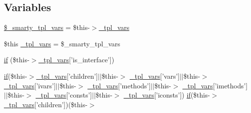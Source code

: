 \subsection*{\-Variables}
\begin{DoxyCompactItemize}
\item 
\hyperlink{34d6fa4bfd5eef6424a9ddc74a166350_2_06_06165_05_06_061653142046_05class_8tpl_8php_a14dde6d029d65a879ee7bc1ebc398dd1}{\$\-\_\-smarty\-\_\-tpl\-\_\-vars} = \$this-\/$>$\hyperlink{_06_06127_05_06_0612781687_05pkgelementindex_8tpl_8php_a4a4846d8e68d455590131a05697f67a3}{\-\_\-tpl\-\_\-vars}
\item 
\$this \hyperlink{34d6fa4bfd5eef6424a9ddc74a166350_2_06_06165_05_06_061653142046_05class_8tpl_8php_a4a4846d8e68d455590131a05697f67a3}{\-\_\-tpl\-\_\-vars} = \$\-\_\-smarty\-\_\-tpl\-\_\-vars
\item 
\hyperlink{34d6fa4bfd5eef6424a9ddc74a166350_2_06_06165_05_06_061653142046_05class_8tpl_8php_a0c616e7915362f321d6e093106e11910}{if} (\$this-\/$>$\hyperlink{_06_06127_05_06_0612781687_05pkgelementindex_8tpl_8php_a4a4846d8e68d455590131a05697f67a3}{\-\_\-tpl\-\_\-vars}\mbox{[}'is\-\_\-interface'\mbox{]})
\item 
\hyperlink{_setup_8inc_8php_ad0184337b31d13763ec8751feff4aabe}{if}(\$this-\/$>$\hyperlink{_06_06127_05_06_0612781687_05pkgelementindex_8tpl_8php_a4a4846d8e68d455590131a05697f67a3}{\-\_\-tpl\-\_\-vars}\mbox{[}'children'\mbox{]}$|$$|$\$this-\/$>$\*
\hyperlink{_06_06127_05_06_0612781687_05pkgelementindex_8tpl_8php_a4a4846d8e68d455590131a05697f67a3}{\-\_\-tpl\-\_\-vars}\mbox{[}'vars'\mbox{]}$|$$|$\$this-\/$>$\*
\hyperlink{_06_06127_05_06_0612781687_05pkgelementindex_8tpl_8php_a4a4846d8e68d455590131a05697f67a3}{\-\_\-tpl\-\_\-vars}\mbox{[}'ivars'\mbox{]}$|$$|$\$this-\/$>$\*
\hyperlink{_06_06127_05_06_0612781687_05pkgelementindex_8tpl_8php_a4a4846d8e68d455590131a05697f67a3}{\-\_\-tpl\-\_\-vars}\mbox{[}'methods'\mbox{]}$|$$|$\$this-\/$>$\*
\hyperlink{_06_06127_05_06_0612781687_05pkgelementindex_8tpl_8php_a4a4846d8e68d455590131a05697f67a3}{\-\_\-tpl\-\_\-vars}\mbox{[}'imethods'\mbox{]}$|$$|$\$this-\/$>$\*
\hyperlink{_06_06127_05_06_0612781687_05pkgelementindex_8tpl_8php_a4a4846d8e68d455590131a05697f67a3}{\-\_\-tpl\-\_\-vars}\mbox{[}'consts'\mbox{]}$|$$|$\$this-\/$>$\*
\hyperlink{_06_06127_05_06_0612781687_05pkgelementindex_8tpl_8php_a4a4846d8e68d455590131a05697f67a3}{\-\_\-tpl\-\_\-vars}\mbox{[}'iconsts'\mbox{]}) \hyperlink{_setup_8inc_8php_ad0184337b31d13763ec8751feff4aabe}{if}(\$this-\/$>$\*
\hyperlink{_06_06127_05_06_0612781687_05pkgelementindex_8tpl_8php_a4a4846d8e68d455590131a05697f67a3}{\-\_\-tpl\-\_\-vars}\mbox{[}'children'\mbox{]})(\$this-\/$>$\*

\end{DoxyCompactItemize}

